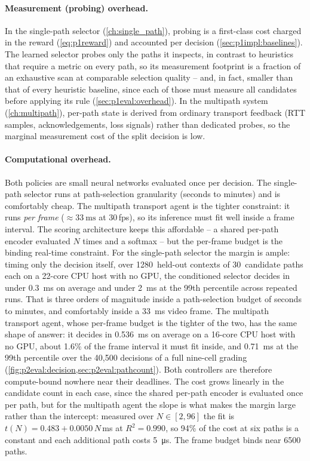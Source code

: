 \paragraph{Measurement (probing) overhead.} In the single-path selector (\cref{ch:single_path}), probing
is a first-class cost charged in the reward (\cref{eq:p1reward}) and accounted per decision
(\cref{sec:p1impl:baselines}). The learned selector probes only the paths it inspects, in contrast to
heuristics that require a metric on every path, so its measurement footprint is a fraction of an exhaustive
scan at comparable selection quality -- and, in fact, smaller than that of every heuristic baseline, since
each of those must measure all candidates before applying its rule (\cref{sec:p1eval:overhead}). In the
multipath system (\cref{ch:multipath}), per-path state is derived from ordinary transport feedback (RTT
samples, acknowledgements, loss signals) rather than dedicated probes, so the marginal measurement cost of
the split decision is low.

\paragraph{Computational overhead.} Both policies are small neural networks evaluated once per decision.
The single-path selector runs at path-selection granularity (seconds to minutes) and is comfortably cheap.
The multipath transport agent is the tighter constraint: it runs \emph{per frame}
(${\approx}\SI{33}{\milli\second}$ at 30\,fps), so its inference must fit well inside a frame interval. The
scoring architecture keeps this affordable -- a shared per-path encoder evaluated $N$ times and a softmax --
but the per-frame budget is the binding real-time constraint. For the single-path selector the margin is
ample: timing only the decision itself, over 1280~held-out contexts of 30~candidate paths each on a
22-core CPU host with no GPU, the conditioned selector decides in under \SI{0.3}{\milli\second} on
average and under \SI{2}{\milli\second} at the 99th percentile across repeated runs. That is three orders
of magnitude inside a path-selection budget of seconds to minutes, and comfortably inside a
\SI{33}{\milli\second} video frame. The multipath transport agent, whose per-frame budget is the
tighter of the two, has the same shape of answer: it decides in \SI{0.536}{\milli\second} on average
on a 16-core CPU host with no GPU, about 1.6\% of the frame interval it must fit inside, and
\SI{0.71}{\milli\second} at the 99th percentile over the 40{,}500 decisions of a full nine-cell grading
(\cref{fig:p2eval:decision,sec:p2eval:pathcount}). Both controllers are therefore compute-bound nowhere
near their deadlines. The cost grows linearly in the candidate count in each case, since the shared
per-path encoder is evaluated once per path, but for the multipath agent the slope is what makes the
margin large rather than the intercept: measured over $N \in [2, 96]$ the fit is
$t(N) = 0.483 + 0.0050\,N$\,ms at $R^2 = 0.990$, so 94\% of the cost at six paths is a constant and each
additional path costs \SI{5}{\micro\second}. The frame budget binds near 6500 paths.

